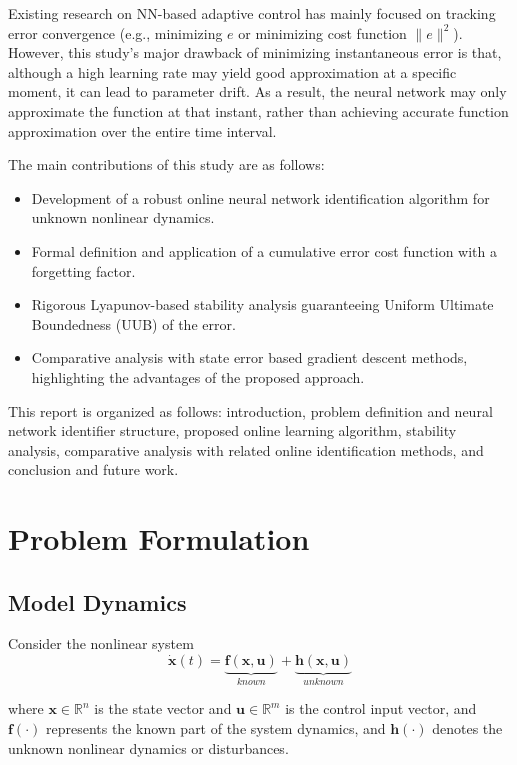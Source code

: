 \documentclass[10pt,twocolumn]{ICCAS}
\begin{document}
Existing research on NN-based adaptive control has mainly focused on tracking error convergence (e.g., minimizing $e$ or minimizing cost function $\|e\|^2$). However, this study's major drawback of minimizing instantaneous error is that, although a high learning rate may yield good approximation at a specific moment, it can lead to parameter drift. As a result, the neural network may only approximate the function at that instant, rather than achieving accurate function approximation over the entire time interval.

The main contributions of this study are as follows:
\begin{itemize}
    \item Development of a robust online neural network identification algorithm for unknown nonlinear dynamics.
    \item Formal definition and application of a cumulative error cost function with a forgetting factor.
    \item Rigorous Lyapunov-based stability analysis guaranteeing Uniform Ultimate Boundedness (UUB) of the error.
    \item Comparative analysis with state error based gradient descent methods, highlighting the advantages of the proposed approach.
\end{itemize}
This report is organized as follows: introduction, problem definition and neural network identifier structure, proposed online learning algorithm, stability analysis, comparative analysis with related online identification methods, and conclusion and future work.

\section{Problem Formulation}
\subsection{Model Dynamics}

Consider the nonlinear system
\begin{equation}
    \dot{\bm{x}}(t) = \underbrace{\bm{f}(\bm{x}, \bm{u})}_{known} + \underbrace{\bm{h}(\bm{x}, \bm{u})}_{unknown}
    \label{eq:realsystem}
\end{equation}

where $\bm{x} \in \mathbb{R}^n$ is the state vector and $\bm{u} \in \mathbb{R}^m$ is the control input vector, and $\bm{f}(\cdot)$ represents the known part of the system dynamics, and $\bm{h}(\cdot)$ denotes the unknown nonlinear dynamics or disturbances.
\end{document}
